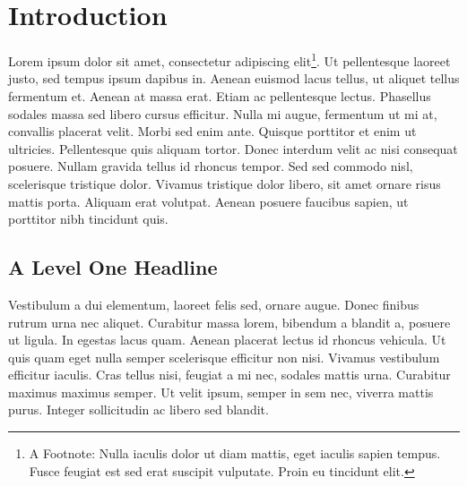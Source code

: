 



\frontmatter
{}




\tableofcontents
\cleardoublepage
\cfoot*{}
\ofoot*{\pagemark}
\mainmatter

\hypertarget{introduction}{%
\chapter{Introduction}\label{introduction}}

Lorem ipsum dolor sit amet, consectetur adipiscing elit\footnote{A
  Footnote: Nulla iaculis dolor ut diam mattis, eget iaculis sapien
  tempus. Fusce feugiat est sed erat suscipit vulputate. Proin eu
  tincidunt elit.}. Ut pellentesque laoreet justo, sed tempus ipsum
dapibus in. Aenean euismod lacus tellus, ut aliquet tellus fermentum et.
Aenean at massa erat. Etiam ac pellentesque lectus. Phasellus sodales
massa sed libero cursus efficitur. Nulla mi augue, fermentum ut mi at,
convallis placerat velit. Morbi sed enim ante. Quisque porttitor et enim
ut ultricies. Pellentesque quis aliquam tortor. Donec interdum velit ac
nisi consequat posuere. Nullam gravida tellus id rhoncus tempor. Sed sed
commodo nisl, scelerisque tristique dolor. Vivamus tristique dolor
libero, sit amet ornare risus mattis porta. Aliquam erat volutpat.
Aenean posuere faucibus sapien, ut porttitor nibh tincidunt
quis.\citep{examplearticle2021}

\hypertarget{a-level-one-headline}{%
\section{A Level One Headline}\label{a-level-one-headline}}

Vestibulum a dui elementum, laoreet felis sed, ornare augue. Donec
finibus rutrum urna nec aliquet. Curabitur massa lorem, bibendum a
blandit a, posuere ut ligula. In egestas lacus quam. Aenean placerat
lectus id rhoncus vehicula. Ut quis quam eget nulla semper scelerisque
efficitur non nisi. Vivamus vestibulum efficitur iaculis. Cras tellus
nisi, feugiat a mi nec, sodales mattis urna. Curabitur maximus maximus
semper. Ut velit ipsum, semper in sem nec, viverra mattis purus. Integer
sollicitudin ac libero sed blandit.

